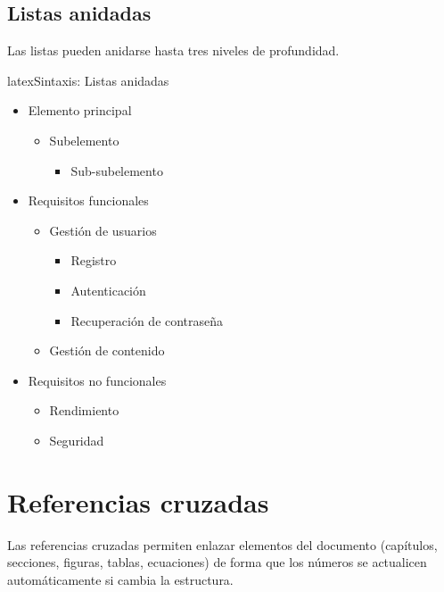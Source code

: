 \subsection{Listas anidadas}

Las listas pueden anidarse hasta tres niveles de profundidad.

\begin{codigosimple}{latex}{Sintaxis: Listas anidadas}
\begin{itemize}
  \item Elemento principal
  \begin{itemize}
    \item Subelemento
    \begin{itemize}
      \item Sub-subelemento
    \end{itemize}
  \end{itemize}
\end{itemize}
\end{codigosimple}

\begin{itemize}
  \item Requisitos funcionales
  \begin{itemize}
    \item Gestión de usuarios
    \begin{itemize}
      \item Registro
      \item Autenticación
      \item Recuperación de contraseña
    \end{itemize}
    \item Gestión de contenido
  \end{itemize}
  \item Requisitos no funcionales
  \begin{itemize}
    \item Rendimiento
    \item Seguridad
  \end{itemize}
\end{itemize}

\section{Referencias cruzadas}
\label{sec:referencias-cruzadas}

Las referencias cruzadas permiten enlazar elementos del documento
(capítulos, secciones, figuras, tablas, ecuaciones) de forma que
los números se actualicen automáticamente si cambia la estructura.

